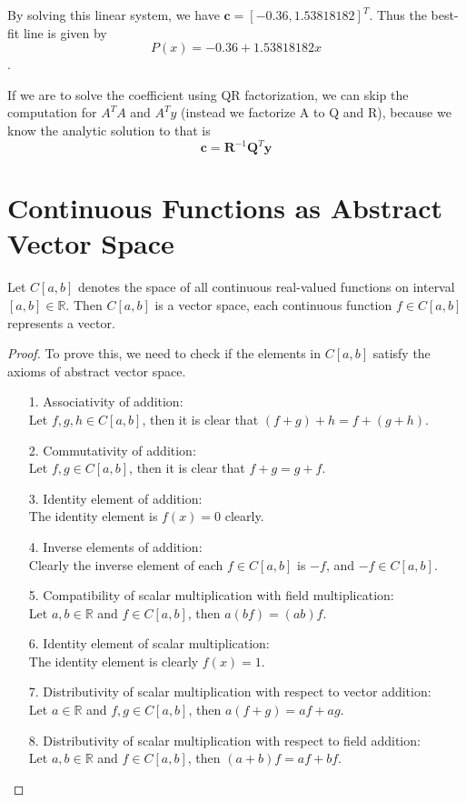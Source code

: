 \begin{solution}
	By solving this linear system, we have $\mathbf{c} = [-0.36, 1.53818182]^T$. Thus the best-fit line is given by
	\[ P(x) = -0.36 + 1.53818182x \].
	
	If we are to solve the coefficient using QR factorization, we can skip the computation for $A^TA$ and $A^Ty$ (instead we factorize A to Q and R), because we know the analytic solution to that is
	\[ \mathbf{c} = \mathbf{R}^{-1} \mathbf{Q}^T \mathbf{y} \]  
\end{solution}


\section{Continuous Functions as Abstract Vector Space}
\begin{thm}
	Let $C[a,b]$ denotes the space of all continuous real-valued functions on interval $[a,b]\in\mathbb{R}$. Then $C[a,b]$ is a vector space, each continuous function $f\in C[a,b]$ represents a vector.
\end{thm}
\begin{proof}
	To prove this, we need to check if the elements in $C[a,b]$ satisfy the axioms of abstract vector space.
	\begin{enumerate}
		\item [1.]
		Associativity of addition:\\
		Let $f,g,h\in C[a,b]$, then it is clear that $(f+g)+h = f+(g+h)$.
		
		\item [2.]
		Commutativity of addition:\\
		Let $f,g\in C[a,b]$, then it is clear that $f+g = g+f$.
		
		\item [3.]
		Identity element of addition:\\
		The identity element is $f(x) = 0$ clearly.
		
		\item [4.]
		Inverse elements of addition:\\
		Clearly the inverse element of each $f\in C[a,b]$ is $-f$, and $-f\in C[a,b]$.
		
		\item [5.]
		Compatibility of scalar multiplication with field multiplication:\\
		Let $a,b\in\mathbb{R}$ and $f\in C[a,b]$, then $a(bf) = (ab)f$.
		
		\item [6.]
		Identity element of scalar multiplication:\\
		The identity element is clearly $f(x) = 1$.
		
		\item [7.]
		Distributivity of scalar multiplication with respect to vector addition:\\
		Let $a\in\mathbb{R}$ and $f,g\in C[a,b]$, then $a(f+g) = af + ag$.
		
		\item [8.]
		Distributivity of scalar multiplication with respect to field addition:\\
		Let $a,b\in\mathbb{R}$ and $f\in C[a,b]$, then $(a+b)f = af + bf$.
		\end{enumerate}
\end{proof}

